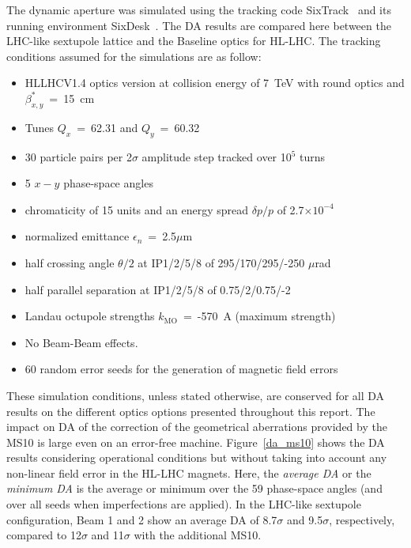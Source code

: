 \documentclass{cernatsnote}
\begin{document}
The dynamic aperture was simulated using the tracking code SixTrack~\cite{six1,six2} and its running environment SixDesk~\cite{sixdesk}. The DA results are compared here between the LHC-like sextupole lattice and the Baseline optics for HL-LHC. The tracking conditions assumed for the simulations are as follow:\\
\begin{itemize}
    \item HLLHCV1.4 optics version at collision energy of 7~TeV with round optics and $\beta_{x,y}^{*}$~=~15~cm
    \item Tunes $Q_{x}$~=~62.31 and $Q_{y}$~=~60.32
    \item 30 particle pairs per 2$\sigma$ amplitude step tracked over 10$^{5}$ turns
    \item 5 $x-y$ phase-space angles
    \item chromaticity of 15 units and an energy spread $\delta p/p$ of 2.7$\times10^{-4}$
    \item normalized emittance $\epsilon_{n}$~=~2.5$\mu$m 
    \item half crossing angle $\theta/2$ at IP1/2/5/8 of 295/170/295/-250 $\mu$rad
    \item half parallel separation at IP1/2/5/8 of 0.75/2/0.75/-2 
    \item Landau octupole strengths $k_{\mathrm{MO}}$~=~-570~A (maximum strength)
    \item No Beam-Beam effects.
    \item 60 random error seeds for the generation of magnetic field errors
\end{itemize}

\noindent These simulation conditions, unless stated otherwise, are conserved for all DA results on the different optics options presented throughout this report. The impact on DA of the correction of the geometrical aberrations provided by the MS10 is large even on an error-free machine. Figure~\ref{da_ms10} shows the DA results considering operational conditions but without taking into account any non-linear field error in the HL-LHC magnets. Here, the \textit{average DA} or the \textit{minimum DA} is the average or minimum over the 59 phase-space angles (and over all seeds when imperfections are applied). In the LHC-like sextupole configuration, Beam 1 and 2 show an average DA of 8.7$\sigma$ and 9.5$\sigma$, respectively, compared to 12$\sigma$ and 11$\sigma$ with the additional MS10.
\end{document}

